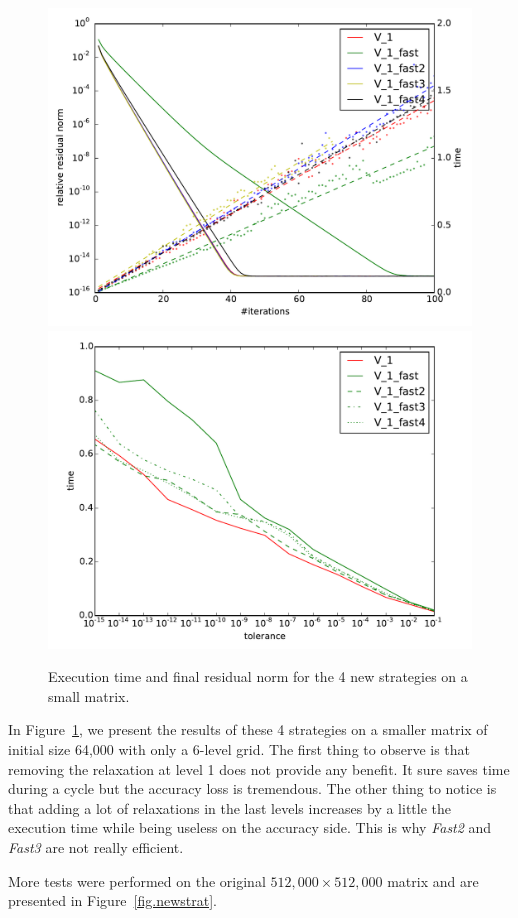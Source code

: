   \begin{figure}
  \includegraphics[width=0.49\linewidth]{figs/convergence_fast_small.pdf}
   \includegraphics[width=0.49\linewidth]{figs/time_convergence_fast_small.pdf}
   \caption{Execution time and final residual norm for the 4 new strategies on a small matrix.}
   \label{fig.newstrat_small}
  \end{figure}

  In Figure~\ref{fig.newstrat_small}, we present the results of these 4 strategies on a smaller matrix of initial size 64,000 with only a 6-level grid.
  The first thing to observe is that removing the relaxation at level 1 does not provide any benefit. It sure saves time during a cycle but the accuracy loss is tremendous.
  The other thing to notice is that adding a lot of relaxations in the last levels increases by a little the execution time while being useless on the accuracy side. This is why \emph{Fast2} and  \emph{Fast3} are not really efficient.
  
  More tests were performed on the original $512,000\times 512,000$ matrix and are presented in Figure~\ref{fig.newstrat}.
  
